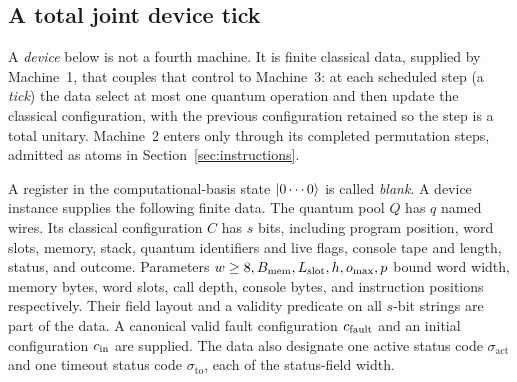 \subsection{A total joint device tick}

A \emph{device} below is not a fourth machine. It is finite classical data,
supplied by Machine~1, that couples that control to Machine~3: at each
scheduled step (a \emph{tick}) the data select at most one quantum operation
and then update the classical configuration, with the previous configuration
retained so the step is a total unitary. Machine~2 enters only through its
completed permutation steps, admitted as atoms in Section~\ref{sec:instructions}.

\begin{definition}
\label{def:device}
A register in the computational-basis state $\lvert 0\cdots0\rangle$ is called
\emph{blank}. A device instance supplies the following finite data. The quantum pool
$Q$ has $q$ named wires. Its classical configuration $C$ has $s$ bits,
including program position, word slots, memory, stack, quantum identifiers
and live flags, console tape and length, status, and outcome. Parameters
$w\geq8,B_{\rm mem},L_{\rm slot},h,o_{\max},p$ bound word width, memory bytes, word slots, call depth,
console bytes, and instruction positions respectively. Their field layout
and a validity predicate on all $s$-bit strings are part of the data.
A canonical valid fault configuration $c_{\rm fault}$ and an initial
configuration $c_{\rm in}$ are supplied.
The data also designate one active status code
$\sigma_{\mathrm{act}}$ and one timeout status code
$\sigma_{\mathrm{to}}$, each of the status-field width.


\end{definition}
